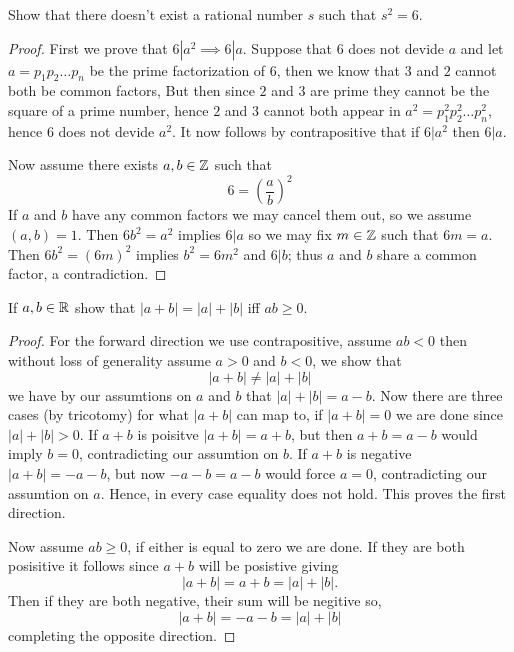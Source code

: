 

\maketitle

\question
Show that there doesn't exist a rational number $s$ such that $s^2 = 6$. 


\begin{proof}
    First we prove that $6|a^2 \implies 6|a$. Suppose that $6$ does not devide $a$ and let $a = p_1p_2 \dots p_n$ 
    be the prime factorization of $6$, then we know that $3$ and $2$ cannot both be common factors,  
    But then since $2$ and $3$ are prime they cannot be the square of a prime number, hence $2$ and $3$ cannot both 
    appear in $a^2 = p_1^2 p_2^2 \dots p_n^2$, hence $6$ does not devide $a^2$. It now follows by contrapositive that 
    if $6|a^2$ then $6|a$. 

    Now assume there exists $a, b \in \mathbb{Z}$ such that 
    \[6 = \left(\frac{a}{b}\right)^2 \]
    If $a$ and $b$ have any common factors we may cancel them out, so we assume $(a, b) = 1$. 
    Then $6b^2 = a^2$ implies $6|a$ so we may fix $m \in \mathbb{Z}$ such that $6m = a$. Then 
    $6b^2 = (6m)^2$ implies $b^2 = 6m^2$ and $6|b$; thus $a$ and $b$ share a common factor, 
    a contradiction. 

\end{proof}

\question
If $a, b \in \mathbb{R}$ show that $|a + b| = |a| + |b| $ iff $ab \geq 0$. 


\begin{proof}
    For the forward direction we use contrapositive, assume $ab < 0$ then without loss of generality assume $a > 0$ and $b<0$, we show that 
    \[|a +b | \neq |a| + |b| \] 
    we have by our assumtions on $a$ and $b$ that $|a| + |b| = a - b$. 
    Now there are three cases (by tricotomy) for what $|a+b|$ can map to, if $|a + b| = 0$
    we are done since $| a| + |b| > 0$. 
    If $a + b$ is poisitve $|a + b| = a + b$, but then $a + b = a - b$ would imply $b = 0$, contradicting our assumtion on $b$.
    If $a + b$ is negative $|a + b| = -a -b$, but now $-a -b = a - b$ would force $a = 0$, contradicting our assumtion on $a$. 
    Hence, in every case equality does not hold. This proves the first direction.
    
    Now assume $ab \geq 0$, if either is equal to zero we are done. If they are both posisitive it follows since $a + b$ will be posistive giving 
    \[|a + b| = a + b = |a| + |b|.\]
    Then if they are both negative, their sum will be negitive so,
    \[|a + b| = -a - b = |a| + |b|\]
    completing the opposite direction. 
\end{proof}

